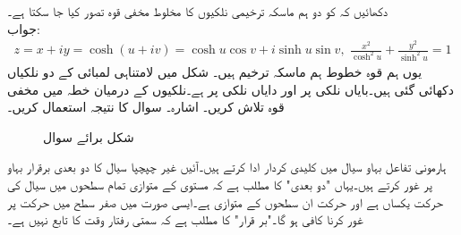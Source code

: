 \quad
دکھائیں کہ  کو دو ہم ماسکہ ترخیمی نلکیوں کا مخلوط مخفی قوہ تصور کیا جا سکتا ہے۔\\
جواب:\quad
\begin{align*}
z=x+iy=\cosh(u+iv)=\cosh u\cos v+i\sinh u\sin v,\,\, \frac{x^2}{\cosh^2 u}+\frac{y^2}{\sinh^2 u}=1
\end{align*} 
یوں ہم قوہ خطوط  ہم ماسکہ ترخیم ہیں۔
\quad
شکل  میں لامتناہی لمبائی کے دو نلکیاں دکھائی گئی ہیں۔بایاں نلکی پر  اور دایاں نلکی پر  ہے۔نلکیوں کے درمیان خطہ میں مخفی قوہ  تلاش کریں۔ اشارہ۔ سوال  کا نتیجہ استعمال کریں۔
\begin{figure}
\centering
{}
\caption{شکل برائے سوال }
\label{شکل_سوال_مخفی_قوہ_دو_نلکی}
\end{figure}

ہارمونی تفاعل بہاو سیال میں کلیدی کردار ادا کرتے ہیں۔آئیں غیر چپچپا سیال کا دو بعدی برقرار بہاو پر غور کرتے ہیں۔یہاں "دو بعدی" کا مطلب ہے کہ  مستوی کے متوازی تمام سطحوں میں سیال کی حرکت یکساں ہے اور حرکت ان سطحوں کے متوازی ہے۔ایسی صورت میں صفر  سطح میں حرکت پر غور کرنا کافی ہو گا۔"بر قرار" کا مطلب ہے کہ  سمتی رفتار وقت کا تابع نہیں ہے۔


